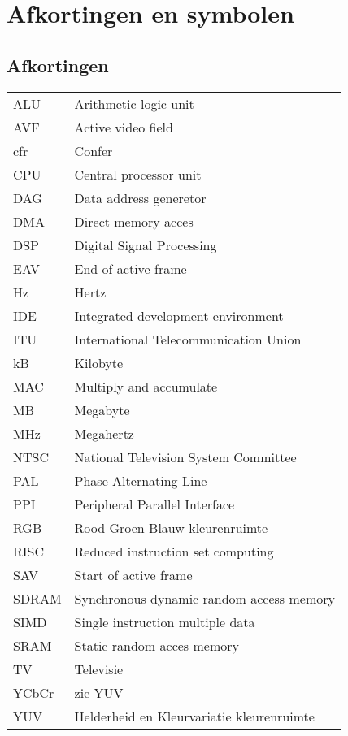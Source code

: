 \chapter{Afkortingen en symbolen}
\section*{Afkortingen}
\begin{flushleft}
  \renewcommand{\arraystretch}{1.1}
  \begin{tabularx}{\textwidth}{@{}p{12mm}X@{}}
    ALU & Arithmetic logic unit \\  
    AVF & Active video field \\ 
    cfr & Confer \\ 
    CPU & Central processor unit \\ 
    DAG & Data address generetor \\  
    DMA & Direct memory acces \\  
    DSP & Digital Signal Processing \\  
    EAV & End of active frame \\  
    Hz  & Hertz \\  
    IDE & Integrated development environment\\  
    ITU & International Telecommunication Union \\  
    kB  & Kilobyte \\ 
    MAC & Multiply and accumulate \\  
    MB  & Megabyte \\ 
    MHz & Megahertz\\ 
    NTSC & National Television System Committee \\  
    PAL &  Phase Alternating Line \\  
    PPI & Peripheral Parallel Interface \\  
    RGB & Rood Groen Blauw kleurenruimte \\
    RISC & Reduced instruction set computing \\ 
    SAV & Start of active frame\\ 
    SDRAM & Synchronous dynamic random access memory \\ 
    SIMD & Single instruction multiple data\\ 
    SRAM & Static random acces memory \\  
    TV   & Televisie \\ 
    YCbCr & zie YUV \\  
    YUV & Helderheid en Kleurvariatie kleurenruimte \\  
  \end{tabularx}
\end{flushleft}

